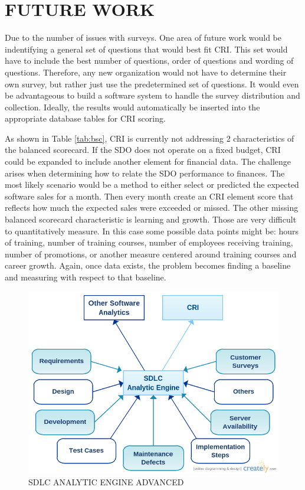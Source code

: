 \documentclass[SDSUThesis.tex]{subfiles}
\begin{document}
\section{FUTURE WORK}

Due to the number of issues with surveys.  One area of future work would be indentifying
a general set of questions that would best fit CRI.  This set would have to include
the best number of questions, order of questions and wording of questions.  Therefore,
any new organization would not have to determine their own survey, but rather just use the
predetermined set of questions.  It would even be advantageous to build a software system to
handle the survey distribution and collection.  Ideally, the results would automatically be
inserted into the appropriate database tables for CRI scoring. 

As shown in Table \ref{tab:bsc}, CRI is currently not addressing 2 characteristics of the balanced scorecard.  If the SDO does not operate on a fixed budget, CRI could be 
expanded to include another element for financial data. The challenge arises when
determining how to relate the SDO performance to finances.  The most likely scenario
would be a method to either select or predicted the expected software sales
for a month.  Then every month create an CRI element score that reflects
how much the expected sales were exceeded or missed.  The other missing
balanced scorecard characteristic is learning and growth.  Those are very difficult
to quantitatively measure.  In this case some possible data points might be:
hours of training, number of training courses, number of employees receiving
training, number of promotions, or another measure centered around training
courses and career growth.  Again, once data exists, the problem becomes finding
a baseline and measuring with respect to that baseline.


\begin{figure}[ht]
\includegraphics[scale=.6]{images/sdlcae-adv.png}
\caption{SDLC ANALYTIC ENGINE ADVANCED}
\label{fig:sdlc-ae-adv}
\end{figure}
\end{document}

